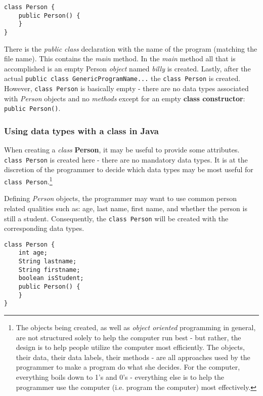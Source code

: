 \documentclass{article}
\begin{document}
\begin{flushleft}
\begin{verbatim}
class Person {
    public Person() {
    }
}

\end{verbatim}

There is the \emph{public class} declaration with the name of the program (matching the file name). This contains the \emph{main} method. In the \emph{main} method all that is accomplished is an empty Person \emph{object} named \textit{billy} is created. Lastly, after the actual  \texttt{public class GenericProgramName{...}} the \texttt{class Person} is created. However, \texttt{class Person} is basically empty - there are no data types associated with \emph{Person} objects and  no \emph{methods}  except for an empty \textbf{class constructor}: \texttt{public Person(){}}. \par

\subsubsection{Using data types with a class in Java}
When creating a \emph{class} \textbf{Person}, it may be useful to provide some attributes. \texttt{class Person} is created here - there are no mandatory data types. It is at the discretion of the programmer to decide which data types may be most useful for \texttt{class Person}.\footnote{The objects being created, as well as \emph{object oriented} programming in general, are not structured solely to help the computer run best - but rather, the design is to help people utilize the computer most efficiently. The objects, their data, their data labels, their methods - are all approaches used by the programmer to make a program do what she decides. For the computer, everything boils down to 1's and 0's - everything else is to help the programmer use the computer (i.e. program the computer) most effectively.}\par
Defining \emph{Person} objects, the programmer may want to use common person related qualities such as: age, last name, first name, and whether the person is still a student. Consequently, the \texttt{class Person} will be created with the corresponding data types.

\label{code:mostbasicdatatypes}
\begin{verbatim}
class Person {
    int age; 
    String lastname;
    String firstname;
    boolean isStudent;
    public Person() {
    }
}
\end{verbatim}


\end{flushleft}
\end{document}
